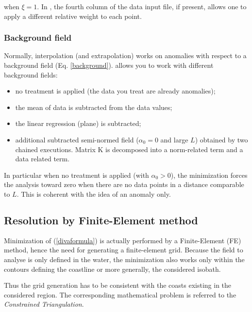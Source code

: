 when $\xi=1$. In  \diva, the fourth column of the data input file, if present, allows one 
to apply a different relative weight to each point. 


\subsubsection{Background field\label{sec:backgroundfield}}

Normally, interpolation (and extrapolation) works on anomalies with respect to a background field (Eq. \ref{background}). \diva allows you to work with different background fields:

\begin{itemize}
\item no treatment is applied (the data you treat are already anomalies);
\item the mean of data is subtracted from the data values;
\item the linear regression (plane) is subtracted;
\item additional subtracted semi-normed field ($\alpha_0=0$ and large $L$) obtained by two chained \diva executions. Matrix K is decomposed into a norm-related term and a data related term.
\end{itemize}

In particular when no treatment is applied (with $\alpha_0 > 0$), the minimization forces the analysis toward zero when there are no
data points in a distance comparable to $L$. This is coherent with the idea of an anomaly only.

\subsection{Resolution by Finite-Element method\label{sec:finiteelements}}

Minimization of (\ref{divaformula}) is actually performed by a Finite-Element (FE) method, hence the need for generating a finite-element grid. 
Because the field to analyse is only defined in the water, the minimization also works only within the contours defining the coastline or more generally, the considered isobath.

Thus the grid generation has to be consistent with the coasts existing in the considered region. The corresponding mathematical problem is referred to the \textit{Constrained Triangulation}. %


